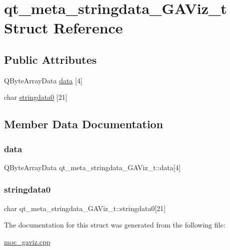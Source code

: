 \hypertarget{structqt__meta__stringdata___g_a_viz__t}{}\section{qt\+\_\+meta\+\_\+stringdata\+\_\+\+G\+A\+Viz\+\_\+t Struct Reference}
\label{structqt__meta__stringdata___g_a_viz__t}
\subsection*{Public Attributes}
\begin{DoxyCompactItemize}
\item 
Q\+Byte\+Array\+Data \hyperlink{structqt__meta__stringdata___g_a_viz__t_a0e3f8170f5c1dc9372bf369ac979f0b8}{data} \mbox{[}4\mbox{]}
\item 
char \hyperlink{structqt__meta__stringdata___g_a_viz__t_a5dc612801d50c66d8c631d8fade55923}{stringdata0} \mbox{[}21\mbox{]}
\end{DoxyCompactItemize}


\subsection{Member Data Documentation}
\mbox{\label{structqt__meta__stringdata___g_a_viz__t_a0e3f8170f5c1dc9372bf369ac979f0b8}} 
\subsubsection{\texorpdfstring{data}{data}}
{\footnotesize\ttfamily Q\+Byte\+Array\+Data qt\+\_\+meta\+\_\+stringdata\+\_\+\+G\+A\+Viz\+\_\+t\+::data\mbox{[}4\mbox{]}}

\mbox{\label{structqt__meta__stringdata___g_a_viz__t_a5dc612801d50c66d8c631d8fade55923}} 
\subsubsection{\texorpdfstring{stringdata0}{stringdata0}}
{\footnotesize\ttfamily char qt\+\_\+meta\+\_\+stringdata\+\_\+\+G\+A\+Viz\+\_\+t\+::stringdata0\mbox{[}21\mbox{]}}



The documentation for this struct was generated from the following file\+:\begin{DoxyCompactItemize}
\item 
\hyperlink{moc__gaviz_8cpp}{moc\+\_\+gaviz.\+cpp}\end{DoxyCompactItemize}
